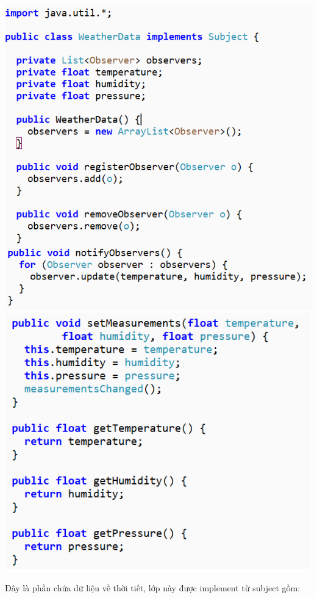 \begin{multicols}{2}
\includegraphics[width=\columnwidth]{GALLEYS/images/chapter2/images4}\\
\includegraphics[width=\columnwidth]{GALLEYS/images/chapter2/images5}\\
\end{multicols}
Đây là phần chứa dữ liệu về thời tiết, lớp này được implement từ subject gồm:\\
